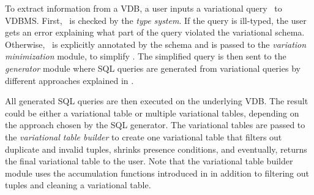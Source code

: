 To extract information from a VDB, 
a user inputs a variational query \vQ\ to VDBMS.
%
First, \vQ\ is checked by the \emph{type system}.
If the query is ill-typed, the user gets an error explaining what part of the 
query violated the variational schema.
Otherwise, 
\vQ\ is explicitly annotated by the schema and
%
is passed to the \emph{variation minimization} module,
to simplify \vQ.
%
The simplified query is then sent to the \emph{generator} module where
SQL queries are generated from variational queries by different approaches explained 
in .

All generated SQL queries are then executed on the underlying VDB.
 The result could be either 
a variational table or multiple variational tables, depending on the approach chosen by
the SQL generator. The variational tables are passed
to the \emph{variational table builder}
to create one variational table that filters out 
duplicate and invalid tuples, shrinks presence conditions, and 
eventually, returns the final variational table to the user.
Note that the variational table builder module uses the accumulation
functions introduced in  in addition to filtering out tuples and 
cleaning a variational table. 

